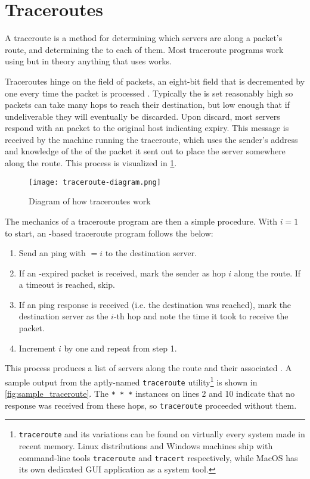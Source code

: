\section{Traceroutes}\label{sec:background_traceroutes}

A traceroute is a method for determining which servers are along a packet's route, and determining the \rtt to each of them. Most traceroute programs work using \icmp but in theory anything that uses \ip works.

Traceroutes hinge on the \ttl field of \ip packets, an eight-bit field that is decremented by one every time the packet is processed \cite{rfc791}. Typically the \ttl is set reasonably high so packets can take many hops to reach their destination, but low enough that if undeliverable they will eventually be discarded. Upon discard, most servers respond with an \icmp packet to the original host indicating \ttl expiry. This message is received by the machine running the traceroute, which uses the sender's \ip address and knowledge of the \ttl of the packet it sent out to place the server somewhere along the route. This process is visualized in \cref{fig:traceroute_diagram}.

\begin{figure}[htb]
    \centering
    \texttt{[image: traceroute-diagram.png]}
    \caption{Diagram of how traceroutes work}
    \label{fig:traceroute_diagram}
\end{figure}

The mechanics of a traceroute program are then a simple procedure. With $i=1$ to start, an \icmp-based traceroute program follows the below:

\begin{enumerate}
    \item Send an \icmp ping with \TTL$=i$ to the destination server.
    \item If an \icmp \ttl-expired packet is received, mark the sender as hop $i$ along the route. If a timeout is reached, skip.
    \item If an \icmp ping response is received (i.e. the destination was reached), mark the destination server as the $i$-th hop and note the time it took to receive the packet.
    \item Increment $i$ by one and repeat from step 1.
\end{enumerate}

This process produces a list of servers along the route and their associated \rtts. A sample output from the aptly-named \texttt{traceroute} utility\footnote{\texttt{traceroute} and its variations can be found on virtually every system made in recent memory. Linux distributions and Windows machines ship with command-line tools \texttt{traceroute} and \texttt{tracert} respectively, while MacOS has its own dedicated GUI application as a system tool.} is shown in \cref{fig:sample_traceroute}. The \texttt{* * *} instances on lines 2 and 10 indicate that no response was received from these hops, so \texttt{traceroute} proceeded without them.

